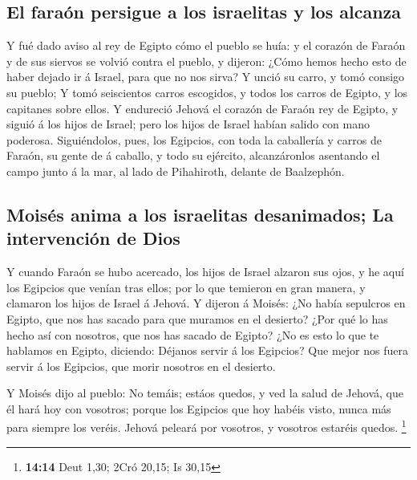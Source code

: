 \hypertarget{el-farauxf3n-persigue-a-los-israelitas-y-los-alcanza}{%
\subsection{El faraón persigue a los israelitas y los
alcanza}\label{el-farauxf3n-persigue-a-los-israelitas-y-los-alcanza}}

 Y fué dado aviso al rey de Egipto cómo el pueblo se huía:
y el corazón de Faraón y de sus siervos se volvió contra el pueblo, y
dijeron: ¿Cómo hemos hecho esto de haber dejado ir á Israel, para que no
nos sirva?  Y unció su carro, y tomó consigo su pueblo;
 Y tomó seiscientos carros escogidos, y todos los carros
de Egipto, y los capitanes sobre ellos.  Y endureció
Jehová el corazón de Faraón rey de Egipto, y siguió á los hijos de
Israel; pero los hijos de Israel habían salido con mano poderosa.
 Siguiéndolos, pues, los Egipcios, con toda la caballería
y carros de Faraón, su gente de á caballo, y todo su ejército,
alcanzáronlos asentando el campo junto á la mar, al lado de Pihahiroth,
delante de Baalzephón.

\hypertarget{moisuxe9s-anima-a-los-israelitas-desanimados-la-intervenciuxf3n-de-dios}{%
\subsection{Moisés anima a los israelitas desanimados; La intervención
de
Dios}\label{moisuxe9s-anima-a-los-israelitas-desanimados-la-intervenciuxf3n-de-dios}}

 Y cuando Faraón se hubo acercado, los hijos de Israel
alzaron sus ojos, y he aquí los Egipcios que venían tras ellos; por lo
que temieron en gran manera, y clamaron los hijos de Israel á Jehová.
 Y dijeron á Moisés: ¿No había sepulcros en Egipto, que
nos has sacado para que muramos en el desierto? ¿Por qué lo has hecho
así con nosotros, que nos has sacado de Egipto?  ¿No es
esto lo que te hablamos en Egipto, diciendo: Déjanos servir á los
Egipcios? Que mejor nos fuera servir á los Egipcios, que morir nosotros
en el desierto.

 Y Moisés dijo al pueblo: No temáis; estáos quedos, y ved
la salud de Jehová, que él hará hoy con vosotros; porque los Egipcios
que hoy habéis visto, nunca más para siempre los veréis. 
Jehová peleará por vosotros, y vosotros estaréis quedos. \footnote{\textbf{14:14}
  Deut 1,30; 2Cró 20,15; Is 30,15}

